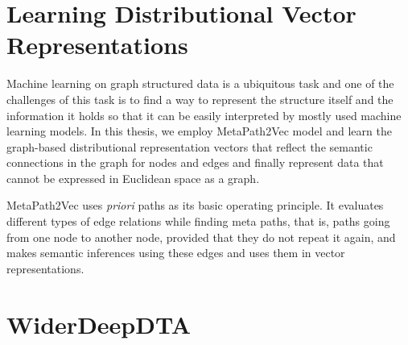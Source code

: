 \section{Learning Distributional Vector Representations}
Machine learning on graph structured data is a ubiquitous task and one of the challenges of this task is to find a way to represent the structure itself and the information it holds so that it can be easily interpreted by mostly used machine learning models. In this thesis, we employ MetaPath2Vec \cite{dong2017metapath2vec} model and learn the graph-based distributional representation vectors that reflect the semantic connections in the graph for nodes and edges and finally represent data that cannot be expressed in Euclidean space as a graph.

MetaPath2Vec uses \textit{priori} paths as its basic operating principle. It evaluates different types of edge relations while finding meta paths, that is, paths going from one node to another node, provided that they do not repeat it again, and makes semantic inferences using these edges and uses them in vector representations.






\section{WiderDeepDTA}
